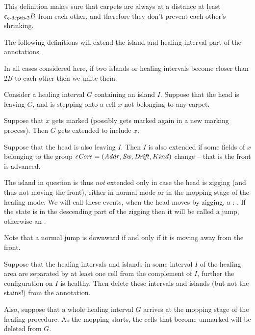 \documentclass[12pt]{memoir}
\newcommand{\fld}[1]{\ensuremath{\textit{#1\/}}}
\def\B{B}
\newcommand{\Addr}{\fld{Addr}}
\newcommand{\cCore}{\fld{cCore}}
\newcommand{\Drift}{\fld{Drift}}
\newcommand{\Sweep}{\fld{Sw}}
\newcommand{\cns}[1]{c_{\textrm{\upshape #1}}}
\newcommand{\cCDepth}[1]{\cns{c-depth-#1}}
\begin{document}
This definition makes sure that carpets are always at a distance at least
\( \cCDepth2\B \) from each other, and therefore they don't prevent 
each other's shrinking.

The following definitions will extend the island and healing-interval part of
the annotations.

\begin{definition}
\label{def:extending-islands}
In all cases considered here, if two islands or
healing intervals become closer than \( 2\B \) to each other then we unite them.

Consider a healing interval \( G \) containing an island \( I \).
Suppose that the head is leaving \( G \), and is stepping onto a
cell \( x \) not belonging to any carpet.
\begin{enumIn}

\item 
Suppose that \( x \) gets marked (possibly gets marked again in a new marking process).
Then \( G \) gets extended to include \( x \).

\item
Suppose that the head is also leaving \( I \).
Then \( I \) is also extended %
if some fields of \( x \) belonging to the group
\( \cCore =(\Addr, \Sweep, \Drift, Kind) \) change -- that is the front is advanced.

\end{enumIn}

The island in question is thus \emph{not} extended only in case
the head is zigging (and thus not moving the front), either in normal mode or in
the mopping stage of the healing mode.
We will call these events, when the head moves by zigging, a :
.
If the state is in the descending part of the zigging then it will be called a
 jump, otherwise an .
\end{definition}

Note that a normal jump is downward if and only if it is moving away from the front.

\begin{definition}\label{def:shrinking} 
Suppose that the healing intervals and islands
in some interval \( I \) of the healing area are separated by at least one cell
from the complement of \( I \), further the configuration on \( I \) is healthy.
Then delete these intervals and islands (but not the stains!) from the annotation.

Also, suppose that a whole healing interval \( G \) arrives at the mopping stage
of the healing procedure.
As the mopping starts, the cells that become unmarked will be deleted from \( G \).

\end{definition}
\end{document}
